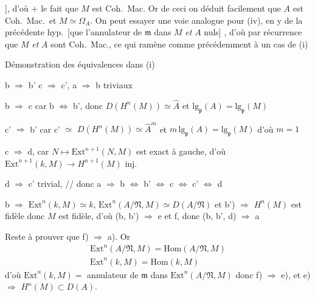 \documentclass[11pt,a4paper]{article}
\begin{document}
], d'où
 $+$ le fait que $M$ est Coh.\ Mac. Or de ceci on déduit
facilement que $A$ est Coh.\ Mac.\ et $M \simeq \Omega_A$. On
peut essayer une voie analogue pour (iv), en y  de la
précédente hyp.\ [que l'annulateur de $\mathfrak{m}$ dans $M$
\emph{et} $A$  nuls] , d'où par récurrence que $M$ \emph{et} $A$ sont
Coh.\ Mac., \struck{\ill{}} ce qui ramène comme
précédemment à un cas de (i)

Démonstration des équivalences dans (i)

b $\Rightarrow$ b' \quad c $\Rightarrow$ c', \quad a $\Rightarrow$ b
\struck{\ill{}} triviaux

b $\Rightarrow$ c car b $\Leftrightarrow$ b', donc
$D(H^n(M)) \simeq \hat{A}$ et
$\mathrm{lg}_{\mathfrak{p}}(A) = \mathrm{lg}_{\mathfrak{p}}(M)$

c' $\Rightarrow$ b' car c' $\simeq$
$D(H^n(M)) \simeq \hat{A}^m$ et
$m\, \mathrm{lg}_{\mathfrak{p}}(A) = \mathrm{lg}_{\mathfrak{p}}(M)$ d'où
$m = 1$

c $\Rightarrow$ d, car $N \mapsto \mathrm{Ext}^{n+1}(N, M)$ est exact à
gauche, d'où $\mathrm{Ext}^{n+1}(k, M) \to H^{n+1}(M)$ inj.

d $\Rightarrow$ c' trivial, \struck{\ill{}} // donc
\qquad a $\Rightarrow$ b $\Leftrightarrow$ b' $\Leftrightarrow$ c
$\Leftrightarrow$ c' $\Leftrightarrow$ d

b $\Rightarrow$ $\mathrm{Ext}^n(k, M) \simeq k$,
$\mathrm{Ext}^n(A/\mathfrak{N}, M) \simeq D(A/\mathfrak{N})$ et
b') $\Rightarrow$ $H^n(M)$ est fidèle donc $M$ est fidèle, d'où
(b, b') $\Rightarrow$ e et f, \quad donc (b, b', d)
$\Rightarrow$ a

Reste à prouver que f) $\Rightarrow$ a). Or 
\[
  \begin{array}{l}
    \mathrm{Ext}^n(A/\mathfrak{N}, M) = \mathrm{Hom}(A/\mathfrak{N}, M) \\
    \mathrm{Ext}^n(k, M) = \mathrm{Hom}(k, M)
  \end{array}
\]
d'où $\mathrm{Ext}^n(k, M) =$ annulateur de $\mathfrak{m}$ dans
$\mathrm{Ext}^n(A/\mathfrak{N}, M)$ donc f) $\Rightarrow$ e), et e)
$\Rightarrow$ $H^n(M) \subset D(A)$. \struck{Donc \ill{}} \add{On va \ill{}
l'annulateur} \struck{\ill{}, si}
\end{document}

